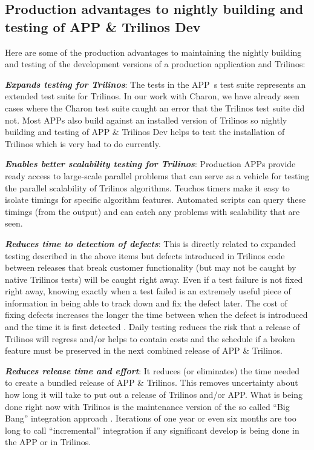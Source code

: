 \documentclass[pdf,ps2pdf,11pt]{SANDreport}
\begin{document}
%
{}\subsection{Production advantages to nightly building and testing of APP \&
Trilinos Dev}
%

Here are some of the production advantages to maintaining the nightly building
and testing of the development versions of a production application and
Trilinos:

{}\textit{\textbf{Expands testing for Trilinos}}: The tests in the APP~s test
suite represents an extended test suite for Trilinos.  In our work with
Charon, we have already seen cases where the Charon test suite caught an error
that the Trilinos test suite did not.  Most APPs also build against an
installed version of Trilinos so nightly building and testing of APP \&
Trilinos Dev helps to test the installation of Trilinos which is very had to
do currently.

{}\textit{\textbf{Enables better scalability testing for Trilinos}}: Production
APPs provide ready access to large-scale parallel problems that can serve as a
vehicle for testing the parallel scalability of Trilinos algorithms.  Teuchos
timers make it easy to isolate timings for specific algorithm features.
Automated scripts can query these timings (from the output) and can catch any
problems with scalability that are seen.

{}\textit{\textbf{Reduces time to detection of defects}}: This is directly related
to expanded testing described in the above items but defects introduced in
Trilinos code between releases that break customer functionality (but may not
be caught by native Trilinos tests) will be caught right away.  Even if a test
failure is not fixed right away, knowing exactly when a test failed is an
extremely useful piece of information in being able to track down and fix the
defect later.  The cost of fixing defects increases the longer the time
between when the defect is introduced and the time it is first detected
{}\cite{book:code-complete-2}.  Daily testing reduces the risk that a release
of Trilinos will regress and/or helps to contain costs and the schedule if a
broken feature must be preserved in the next combined release of APP \&
Trilinos.

{}\textit{\textbf{Reduces release time and effort}}: It reduces (or eliminates)
the time needed to create a bundled release of APP \& Trilinos.  This removes
uncertainty about how long it will take to put out a release of Trilinos
and/or APP.  What is being done right now with Trilinos is the maintenance
version of the so called ``Big Bang'' integration approach
{}\cite{book:code-complete-2}.  Iterations of one year or even six months are
too long to call ``incremental'' integration if any significant develop is
being done in the APP or in Trilinos.
\end{document}

